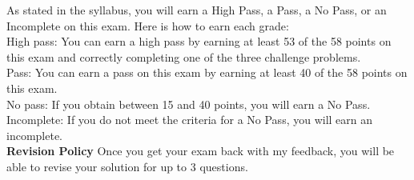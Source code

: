 \documentclass[11pt,addpoints,letterpaper]{exam}
\begin{document}
As stated in the syllabus, you will earn a High Pass, a Pass, a No Pass, or an Incomplete on this exam. Here is how to earn each grade:
\\[1em]
High pass: You can earn a high pass by earning at least 53 of the 58 points on this exam and correctly completing one of the three challenge problems. \\[5pt]
Pass: You can earn a pass on this exam by earning at least 40 of the 58 points on this exam. \\[5pt]
No pass: If you obtain between 15 and 40 points, you will earn a No Pass.\\[5pt]
Incomplete: If you do not meet the criteria for a No Pass, you will earn an incomplete. 
\\[3em]
{\bf Revision Policy} Once you get your exam back with my feedback, you will be able to revise your solution for up to 3 questions. 

\end{document}
